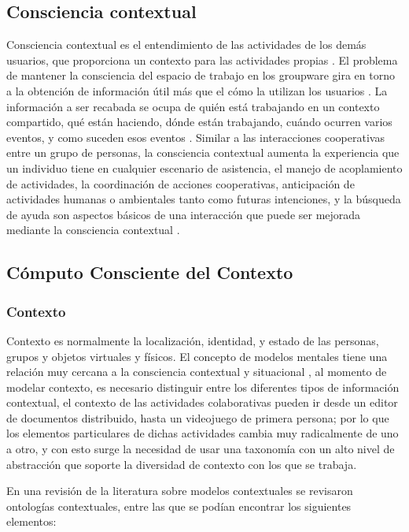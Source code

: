 \subsection{Consciencia contextual}
Consciencia contextual es el entendimiento de las actividades de los dem\'as usuarios, que proporciona un contexto para las actividades propias \cite{dourish1992awareness}. El problema de mantener la consciencia del espacio de trabajo en los groupware gira en torno a la obtenci\'on de informaci\'on \'util m\'as que el c\'omo la utilizan los usuarios \cite{ardissono2012context}. La informaci\'on a ser recabada se ocupa de qui\'en est\'a trabajando en un contexto compartido, qu\'e est\'an haciendo, d\'onde est\'an trabajando, cu\'ando ocurren varios eventos, y como suceden esos eventos \cite{ardissono2012context}. Similar a las interacciones cooperativas entre un grupo de personas, la consciencia contextual aumenta la experiencia que un individuo tiene en cualquier escenario de asistencia, el manejo de acoplamiento de actividades, la coordinaci\'on de acciones cooperativas, anticipaci\'on de actividades humanas o ambientales tanto como futuras intenciones, y la b\'usqueda de ayuda son aspectos b\'asicos de una interacci\'on que puede ser mejorada mediante la consciencia contextual \cite{aehnelt2012discussion}.
\subsection{C\'omputo Consciente del Contexto}
\subsubsection{Contexto}
Contexto es normalmente la localizaci\'on, identidad, y estado de las personas, grupos y objetos virtuales y f\'isicos. El concepto de modelos mentales tiene una relaci\'on muy cercana a la consciencia contextual y situacional \cite{aehnelt2012discussion}, al momento de modelar contexto, es necesario distinguir entre los diferentes tipos de informaci\'on contextual\cite{hoyos2013domain}, el contexto de las actividades colaborativas pueden ir desde un editor de documentos distribuido, hasta un videojuego de primera persona; por lo que los elementos particulares de dichas actividades cambia muy radicalmente de uno a otro, y con esto surge la necesidad de usar una taxonom\'ia con un alto nivel de abstracci\'on que soporte la diversidad de contexto con los que se trabaja.

En una revisi\'on de la literatura sobre modelos contextuales se revisaron ontolog\'ias contextuales, entre las que se pod\'ian encontrar los siguientes elementos:


